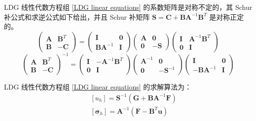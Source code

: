 \begin{lemma}
	LDG 线性代数方程组 \eqref{LDG linear equations} 的系数矩阵是对称不定的，其 Schur 补公式和求逆公式如下给出，并且 Schur 补矩阵 \(\bm S = \bm C + \bm B \bm A^{-1} \bm B^{T}\) 是对称正定的。
	\begin{equation}\label{LDG Schur complement}
		\begin{pmatrix}
			\bm A & \bm B^T \\
			\bm B & -\bm C
		\end{pmatrix}
		= \begin{pmatrix}
			\bm I & \bm 0 \\
			\bm B \bm A^{-1} & \bm I
		\end{pmatrix}
		\begin{pmatrix}
			\bm A & \bm 0 \\
			\bm 0 & -\bm S
		\end{pmatrix}
		\begin{pmatrix}
			\bm I & \bm A^{-1} \bm B^{T} \\
			\bm 0 & \bm I
		\end{pmatrix}
	\end{equation}
	\begin{equation}\label{LDG inverse matrix}
		\begin{pmatrix}
			\bm A & \bm B^T \\
			\bm B & -\bm C
		\end{pmatrix}^{-1}
		= \begin{pmatrix}
			\bm I & -\bm A^{-1} \bm B^{T} \\
			\bm 0 & \bm I
		\end{pmatrix}
		\begin{pmatrix}
			\bm A^{-1} & \bm 0 \\
			\bm 0 & -\bm S^{-1}
		\end{pmatrix}
		\begin{pmatrix}
			\bm I & \bm 0 \\
			-\bm B \bm A^{-1} & \bm I
		\end{pmatrix}
	\end{equation}
\end{lemma}

\begin{corollary}
	LDG 线性代数方程组 \eqref{LDG linear equations} 的求解算法为：
	\begin{subequations}
		\begin{eqnarray}
			&& [u_{h}] = \bm S^{-1} \left(\bm G + \bm B \bm A^{-1} \bm F\right) \\
			&& [\bm\sigma_{h}] = \bm A^{-1}\left(\bm F - \bm B^T \bm u\right)
		\end{eqnarray}
	\end{subequations}
\end{corollary}


